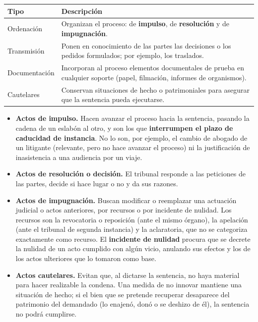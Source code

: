 \documentclass[12pt,oneside]{book}
\renewcommand{\arraystretch}{1.15}
\begin{document}
\begin{table}[H]
\centering
\renewcommand{\arraystretch}{1.25}
\begin{tabularx}{\textwidth}{>{\RaggedRight\arraybackslash}p{}>{\RaggedRight\arraybackslash}X}
\toprule
\textbf{Tipo} & \textbf{Descripción} \\
\midrule
Ordenación & Organizan el proceso: de \textbf{impulso}, de \textbf{resolución} y de \textbf{impugnación}. \\
\addlinespace
Transmisión & Ponen en conocimiento de las partes las decisiones o los pedidos formulados; por ejemplo, los traslados. \\
\addlinespace
Documentación & Incorporan al proceso elementos documentales de prueba en cualquier soporte (papel, filmación, informes de organismos). \\
\addlinespace
Cautelares & Conservan situaciones de hecho o patrimoniales para asegurar que la sentencia pueda ejecutarse. \\
\bottomrule
\end{tabularx}
\end{table}

\begin{itemize}
\item \textbf{Actos de impulso.} Hacen avanzar el proceso hacia la sentencia, pasando la cadena de un eslabón al otro, y son los que \textbf{interrumpen el plazo de caducidad de instancia}. %
No lo son, por ejemplo, el cambio de abogado de un litigante (relevante, pero no hace avanzar el proceso) ni la justificación de inasistencia a una audiencia por un viaje.
\item \textbf{Actos de resolución o decisión.} El tribunal responde a las peticiones de las partes, decide si hace lugar o no y da sus razones.
\item \textbf{Actos de impugnación.} Buscan modificar o reemplazar una actuación judicial o actos anteriores, por recursos o por incidente de nulidad. Los recursos son la revocatoria o reposición (ante el mismo órgano), la apelación (ante el tribunal de segunda instancia) y la aclaratoria, que no se categoriza exactamente como recurso. El \textbf{incidente de nulidad} procura que se decrete la nulidad de un acto cumplido con algún vicio, anulando sus efectos y los de los actos ulteriores que lo tomaron como base.
\item \textbf{Actos cautelares.} Evitan que, al dictarse la sentencia, no haya material para hacer realizable la condena. Una medida de no innovar mantiene una situación de hecho; si el bien que se pretende recuperar desaparece del patrimonio del demandado (lo enajenó, donó o se deshizo de él), la sentencia no podrá cumplirse.
\end{itemize}
\end{document}
